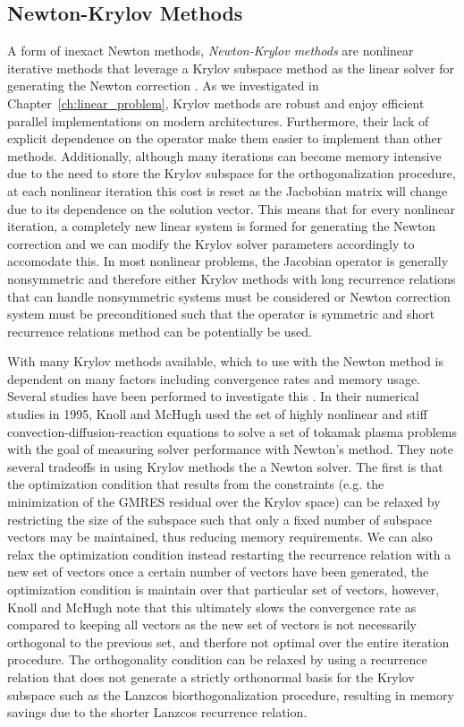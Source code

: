 \subsection{Newton-Krylov Methods}
\label{subsec:newton_krylov_methods}
A form of inexact Newton methods, \textit{Newton-Krylov methods} are
nonlinear iterative methods that leverage a Krylov subspace method as
the linear solver for generating the Newton correction
\citep{kelley_iterative_1995}. As we investigated in
Chapter~\ref{ch:linear_problem}, Krylov methods are robust and enjoy
efficient parallel implementations on modern
architectures. Furthermore, their lack of explicit dependence on the
operator make them easier to implement than other
methods. Additionally, although many iterations can become memory
intensive due to the need to store the Krylov subspace for the
orthogonalization procedure, at each nonlinear iteration this cost is
reset as the Jacbobian matrix will change due to its dependence on the
solution vector. This means that for every nonlinear iteration, a
completely new linear system is formed for generating the Newton
correction and we can modify the Krylov solver parameters accordingly
to accomodate this. In most nonlinear problems, the Jacobian operator
is generally nonsymmetric and therefore either Krylov methods with
long recurrence relations that can handle nonsymmetric systems must be
considered or Newton correction system must be preconditioned such
that the operator is symmetric and short recurrence relations method
can be potentially be used.

With many Krylov methods available, which to use with the Newton
method is dependent on many factors including convergence rates and
memory usage. Several studies have been performed to investigate this
\citep{mchugh_inexact_1993,knoll_newton-krylov_1995}. In their
numerical studies in 1995, Knoll and McHugh used the set of highly
nonlinear and stiff convection-diffusion-reaction equations to solve a
set of tokamak plasma problems with the goal of measuring solver
performance with Newton's method. They note several tradeoffs in using
Krylov methods the a Newton solver. The first is that the optimization
condition that results from the constraints (e.g. the minimization of
the GMRES residual over the Krylov space) can be relaxed by
restricting the size of the subspace such that only a fixed number of
subspace vectors may be maintained, thus reducing memory
requirements. We can also relax the optimization condition instead
restarting the recurrence relation with a new set of vectors once a
certain number of vectors have been generated, the optimization
condition is maintain over that particular set of vectors, however,
Knoll and McHugh note that this ultimately slows the convergence rate
as compared to keeping all vectors as the new set of vectors is not
necessarily orthogonal to the previous set, and therfore not optimal
over the entire iteration procedure. The orthogonality condition can
be relaxed by using a recurrence relation that does not generate a
strictly orthonormal basis for the Krylov subspace such as the Lanzcos
biorthogonalization procedure, resulting in memory savings due to the
shorter Lanzcos recurrence relation.

